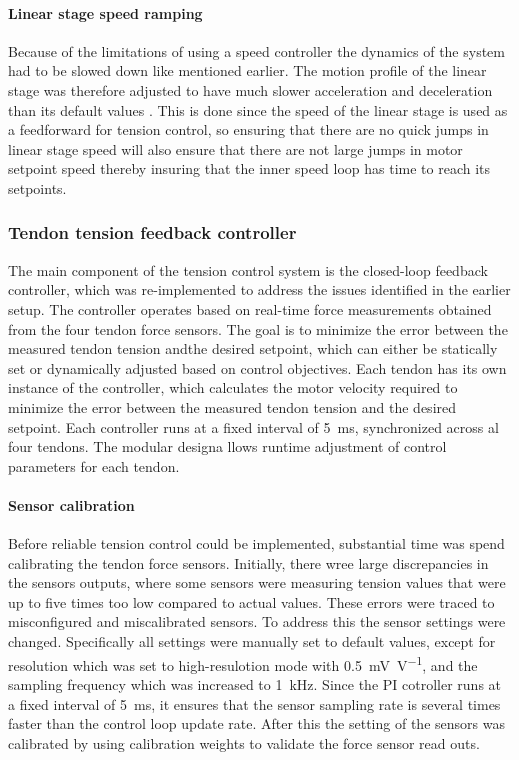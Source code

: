 \paragraph*{Linear stage speed ramping}
Because of the limitations of using a speed controller the dynamics of the system had to be slowed down like mentioned earlier. The motion profile of the linear stage was therefore adjusted to have much slower acceleration and deceleration than its default values . This is done since the speed of the linear stage is used as a feedforward for tension control, so ensuring that there are no quick jumps in linear stage speed will also ensure that there are not large jumps in motor setpoint speed thereby insuring that the inner speed loop has time to reach its setpoints.


\subsubsection{Tendon tension feedback controller}
The main component of the tension control system is the closed-loop feedback controller, which was re-implemented to address the issues identified in the earlier setup. The controller operates based on real-time force measurements obtained from the four tendon force sensors. The goal is to minimize the error between the measured tendon tension andthe desired setpoint, which can either be statically set or dynamically adjusted based on control objectives. 
\newline \newline
Each tendon has its own instance of the controller, which calculates the motor velocity required to minimize the error between the measured tendon tension and the desired setpoint. Each controller runs at a fixed interval of \SI{5}{\milli \second}, synchronized across al four tendons. The modular designa llows runtime adjustment of control parameters for each tendon.

\paragraph*{Sensor calibration}
Before reliable tension control could be implemented, substantial time was spend calibrating the tendon force sensors. Initially, there wree large discrepancies in the sensors outputs, where some sensors were measuring tension values that were up to five times too low compared to actual values. These errors were traced to misconfigured and miscalibrated sensors. To address this the sensor settings were changed. Specifically all settings were manually set to default values, except for resolution which was set to high-resulotion mode with  \SI{0.5}{\milli\volt\per\volt}, and the sampling frequency which was increased to \SI{1}{\kilo\hertz}. Since the PI cotroller runs at a fixed interval of \SI{5}{\milli\second}, it ensures that the sensor sampling rate is several times faster than the control loop update rate. After this the setting of the sensors was calibrated by using calibration weights to validate the force sensor read outs.

